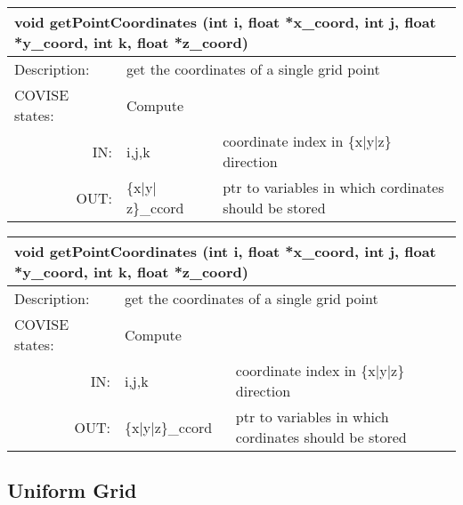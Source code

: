 \latexonly
\begin{longtable}{|p{4cm}|p{2.5cm}|p{7cm}|}
\hline
\multicolumn{3}{|p{13.5cm}|}{\bf void getPointCoordinates \newline
(int i, float *x\_coord, int j,  float *y\_coord,  int k, float *z\_coord)}\\
\hline
{Description:}  
           & \multicolumn{2}{p{9.5cm}|}{get the coordinates of a single grid point} \\
\hline
{COVISE states:}  
           & \multicolumn{2}{p{9.5cm}|}{Compute} \\
\hline
\multicolumn{1}{|r|}{IN:} & \multicolumn{1}{p{3cm}|}{i,j,k} 
                          & \multicolumn{1}{p{5cm}|}{coordinate index in 
			     \{x$\mid$y$\mid$z\} direction}\\
\hline
\multicolumn{1}{|r|}{OUT:} & \multicolumn{1}{p{3cm}|}{\{x$\mid$y$\mid$z\}\_ccord} 
                          & \multicolumn{1}{p{5cm}|}{ptr to variables in 
			  which cordinates should be stored}\endhead
\hline
\end{longtable}
\endlatexonly

\begin{htmlonly}
\begin{longtable}{|p{4cm}|p{2.5cm}|p{7cm}|}
\hline
\multicolumn{3}{|p{13.5cm}|}{\bf void getPointCoordinates \newline
(int i, float *x\_coord, int j,  float *y\_coord,  int k, float *z\_coord)}\\
\hline
{Description:}  
           & \multicolumn{2}{p{9.5cm}|}{get the coordinates of a single grid point} \\
\hline
{COVISE states:}  
           & \multicolumn{2}{p{9.5cm}|}{Compute} \\
\hline
\multicolumn{1}{|r|}{IN:} & \multicolumn{1}{p{3cm}|}{i,j,k} 
                          & \multicolumn{1}{p{5cm}|}{coordinate index in 
			     \{x|y|z\} direction}\\
\hline
\multicolumn{1}{|r|}{OUT:} & \multicolumn{1}{p{3cm}|}{\{x|y|z\}\_ccord} 
                          & \multicolumn{1}{p{5cm}|}{ptr to variables in 
			  which cordinates should be stored}\endhead
\hline
\end{longtable}
\end{htmlonly}


\subsection{Uniform Grid}

